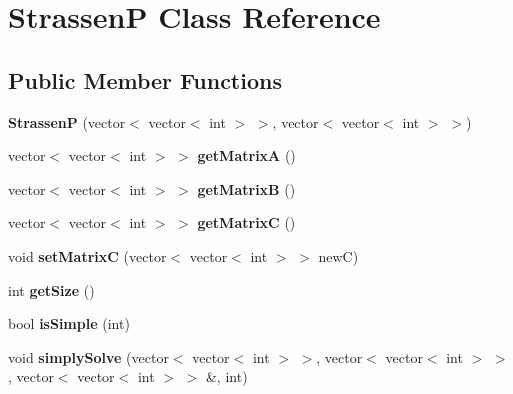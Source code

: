 \hypertarget{classStrassenP}{\section{Strassen\-P Class Reference}
\label{classStrassenP}
}
\subsection*{Public Member Functions}
\begin{DoxyCompactItemize}
\item 
\hypertarget{classStrassenP_af667546e759d6dbe9450123456d837f9}{{\bfseries Strassen\-P} (vector$<$ vector$<$ int $>$ $>$, vector$<$ vector$<$ int $>$ $>$)}\label{classStrassenP_af667546e759d6dbe9450123456d837f9}

\item 
\hypertarget{classStrassenP_a90a8518a66195a450fa092f81b2afc53}{vector$<$ vector$<$ int $>$ $>$ {\bfseries get\-Matrix\-A} ()}\label{classStrassenP_a90a8518a66195a450fa092f81b2afc53}

\item 
\hypertarget{classStrassenP_ab3f3e1e534100d093f694a15d46da9e1}{vector$<$ vector$<$ int $>$ $>$ {\bfseries get\-Matrix\-B} ()}\label{classStrassenP_ab3f3e1e534100d093f694a15d46da9e1}

\item 
\hypertarget{classStrassenP_aeefdfffdfcd6b50b53ccb5219c73f8bc}{vector$<$ vector$<$ int $>$ $>$ {\bfseries get\-Matrix\-C} ()}\label{classStrassenP_aeefdfffdfcd6b50b53ccb5219c73f8bc}

\item 
\hypertarget{classStrassenP_ad2febb1be9ba3f9713d60c6af1c1ca8a}{void {\bfseries set\-Matrix\-C} (vector$<$ vector$<$ int $>$ $>$ new\-C)}\label{classStrassenP_ad2febb1be9ba3f9713d60c6af1c1ca8a}

\item 
\hypertarget{classStrassenP_a49d9cae3084d28dc7a50dea925235b63}{int {\bfseries get\-Size} ()}\label{classStrassenP_a49d9cae3084d28dc7a50dea925235b63}

\item 
\hypertarget{classStrassenP_ac47e1183af813fac2160281bcb7308dd}{bool {\bfseries is\-Simple} (int)}\label{classStrassenP_ac47e1183af813fac2160281bcb7308dd}

\item 
\hypertarget{classStrassenP_af3fe4a89fe5b4743c99965881afc6f62}{void {\bfseries simply\-Solve} (vector$<$ vector$<$ int $>$ $>$, vector$<$ vector$<$ int $>$ $>$, vector$<$ vector$<$ int $>$ $>$ \&, int)}\label{classStrassenP_af3fe4a89fe5b4743c99965881afc6f62}


\end{DoxyCompactItemize}
